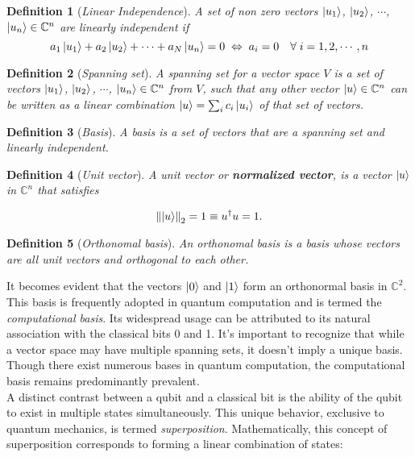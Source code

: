 \documentclass[12pt,a4paper]{report}
\newtheorem{definition}{Definition}
\newcommand{\norm}[1]{\left\| #1 \right\|}
\begin{document}
\begin{definition}[\emph{Linear Independence}] 
A set of non zero vectors $\ket{u_1}$, $\ket{u_2}$, $\cdots$, $\ket{u_n} \in \mathbb{C}^n$ are linearly independent if
\begin{equation}
    a_1\ket{u_1} + a_2\ket{u_2} + \cdots + a_N \ket{u_n} = 0 \;
    \Leftrightarrow \; a_i = 0 \quad \forall \; i = 1,2,\cdots,n
\end{equation}
\end{definition}

\begin{definition}[\emph{Spanning set}]
A spanning set for a vector space \(V\) is a set of vectors $\ket{u_1}$, $\ket{u_2}$, $\cdots$, $\ket{u_n} \in \mathbb{C}^n$ from \(V\), such that any other vector $\ket{u} \in \mathbb{C}^n$ can be written as a linear combination $\ket{u} = \sum_i c_i \ket{u_i}$ of that set of vectors.
\end{definition}

\begin{definition}[\emph{Basis}]
A basis is a set of vectors that are a spanning set and linearly independent.
\end{definition}

\begin{definition}[\emph{Unit vector}]
A unit vector or \textbf{normalized vector}, is a vector $\ket{u}$ in $\mathbb{C}^n$ that satisfies

\[
\norm{\ket{u}}_2 = 1 \equiv {u}^\dagger {u} = 1.
\]

\end{definition}

\begin{definition}[\emph{Orthonomal basis}]
An orthonomal basis is a basis whose vectors are all unit vectors and orthogonal to each other.
\end{definition}

\noindent
It becomes evident that the vectors $\ket{0}$ and $\ket{1}$ form an orthonormal basis in $\mathbb{C}^2$. This basis is frequently adopted in quantum computation and is termed the \emph{computational basis}. Its widespread usage can be attributed to its natural association with the classical bits 0 and 1. It's important to recognize that while a vector space may have multiple spanning sets, it doesn't imply a unique basis. Though there exist numerous bases in quantum computation, the computational basis remains predominantly prevalent.
\\

\noindent
A distinct contrast between a qubit and a classical bit is the ability of the qubit to exist in multiple states simultaneously. This unique behavior, exclusive to quantum mechanics, is termed \emph{superposition}. Mathematically, this concept of superposition corresponds to forming a linear combination of states:
\end{document}
